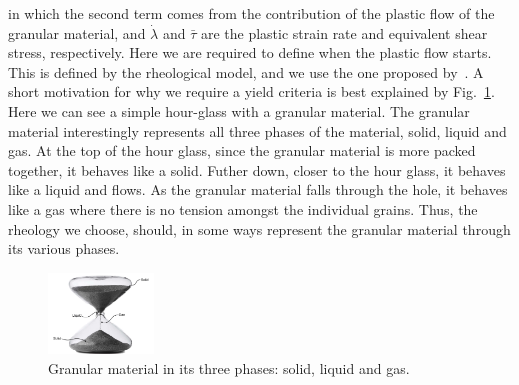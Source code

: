 \documentclass{article}
\begin{document}
in which the second term comes from the contribution of the plastic flow of the granular material, and $\dot{\lambda}$ and $\bar{\tau}$ are the plastic strain rate and equivalent shear stress, respectively. Here we are required to define when the plastic flow starts. This is defined by the rheological model, and we use the one proposed by~\citep{Dunatunga2015}. A short motivation for why we require a yield criteria is best explained by Fig.~\ref{fig:yield_criteria}. Here we can see a simple hour-glass with a granular material. The granular material interestingly represents all three phases of the material, solid, liquid and gas. At the top of the hour glass, since the granular material is more packed together, it behaves like a solid. Futher down, closer to the hour glass, it behaves like a liquid and flows. As the granular material falls through the hole, it behaves like a gas where there is no tension amongst the individual grains. Thus, the rheology we choose, should, in some ways represent the granular material through its various phases.
\begin{figure}[h]
  \centering
  \includegraphics[width=0.25\textwidth]{./img/yield_criteria.png}
  \caption{Granular material in its three phases: solid, liquid and gas.}
  \label{fig:yield_criteria}
\end{figure}
\end{document}
